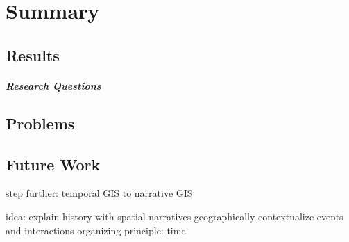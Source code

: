 
\chapter{Summary} %
\label{sec:summary}


\section{Results} %
\label{sub:results}



\paragraph{Research Questions} %
\label{par:result_research_questions}



\section{Problems} %
\label{sub:problems}




\section{Future Work} %
\label{sub:future_work}

step further: temporal GIS to narrative GIS

idea: explain history with spatial narratives
  geographically contextualize events and interactions
  organizing principle: time




